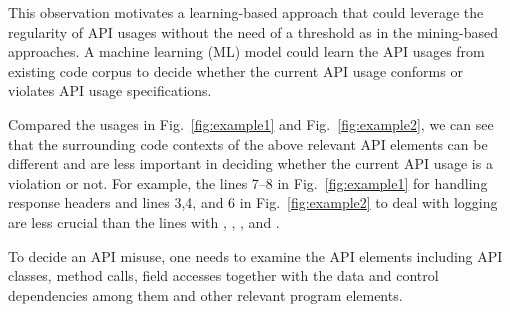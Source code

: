 This observation motivates a learning-based approach that could
leverage the regularity of API usages without the need of a threshold
as in the mining-based approaches. A machine learning (ML) model could
learn the API usages from existing code corpus to decide whether the
current API usage conforms or violates API usage specifications.

Compared the usages in Fig.~\ref{fig:example1} and
Fig.~\ref{fig:example2}, we can see that the surrounding code contexts
of the above relevant API elements can be different and are less
important in deciding whether the current API usage is a violation or
not. For example, the lines 7--8 in Fig.~\ref{fig:example1} for
handling response headers and lines 3,4, and 6 in
Fig.~\ref{fig:example2} to deal with logging are less crucial than the
lines with , ,
, and .

\begin{Observation}
To decide an API misuse, one needs to examine the API elements
including API classes, method calls, field accesses together with the
data and control dependencies among them and other relevant program
elements.
\end{Observation}

%
